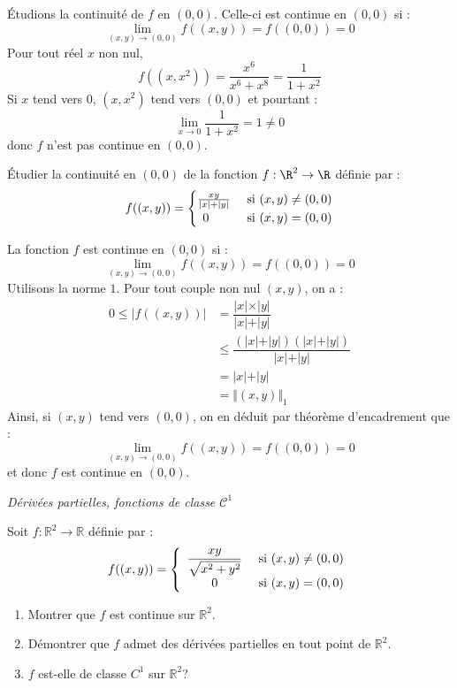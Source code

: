 \documentclass[a4paper,10pt]{report}
\begin{document}
\medskip

\noindent Étudions la continuité de $f$ en $(0,0)$. Celle-ci est continue en $(0,0)$ si :
$$ \lim_{(x,y) \rightarrow (0,0)} f((x,y)) =f((0,0))= 0$$
Pour tout réel $x$ non nul,
$$ f((x,x^2)) = \dfrac{x^6}{x^6+x^8} = \dfrac{1}{1+x^2}$$
Si $x$ tend vers $0$, $(x,x^2)$ tend vers $(0,0)$ et pourtant :
$$ \lim_{x \rightarrow 0} \dfrac{1}{1+x^2} = 1 \neq 0$$
donc $f$ n'est pas continue en $(0,0)$.

\begin{Exa} Étudier la continuité en $(0,0)$ de la fonction $f : \R^{2} \rightarrow \R$ définie par :
  \[
  f((x,y)) =
  \begin{cases}
    \frac{xy}{\vert x \vert + \vert y \vert} & \hbox{ si } (x,y) \neq (0,0) \\
    \, \; 0 & \hbox{ si } (x,y)=(0,0)
  \end{cases}
  \]
\end{Exa}

\corr La fonction $f$ est continue en $(0,0)$ si :
$$ \lim_{(x,y) \rightarrow (0,0)} f((x,y)) =f((0,0))= 0$$
Utilisons la norme $1$. Pour tout couple non nul $(x,y)$, on a :
\begin{align*}
0 \leq \vert f((x,y)) \vert & = \dfrac{\vert x \vert \times \vert y \vert}{\vert x \vert + \vert y \vert} \\
& \leq \dfrac{(\vert x \vert + \vert y \vert)(\vert x \vert + \vert y \vert)}{\vert x \vert + \vert y \vert} \\
& = \vert x \vert + \vert y \vert \\
& = \Vert (x,y) \Vert_1
\end{align*}
Ainsi, si $(x,y)$ tend vers $(0,0)$, on en déduit par théorème d'encadrement que :
$$  \lim_{(x,y) \rightarrow (0,0)} f((x,y)) =f((0,0))= 0$$
et donc $f$ est continue en $(0,0)$.

\medskip

\begin{center}
\textit{{ {\large Dérivées partielles, fonctions de classe $\mathcal{C}^1$}}}
\end{center}

\medskip

\begin{Exa} Soit $f : \mathbb{R}^2 \rightarrow \mathbb{R}$ définie par :
$$ f((x,y)) = \left\lbrace \begin{array}{cl}
\dfrac{xy}{\sqrt{x^{2}+y^{2}}} & \hbox{ si } (x,y) \neq (0,0) \\
0 & \hbox{ si } (x,y) = (0,0)\\
\end{array}\right.$$

\begin{enumerate}
\item Montrer que $f$ est continue sur $\mathbb{R}^{2}$.
\item Démontrer que $f$ admet des d\'{e}riv\'{e}es partielles en tout point de $\mathbb{R}^{2}$.
\item $f$ est-elle de classe $C^{1}$ sur $\mathbb{R}^2$?
\end{enumerate}
\end{Exa}
\end{document}
